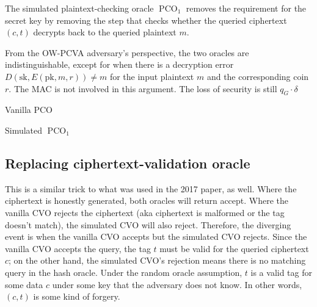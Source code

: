 \documentclass{article}
\begin{document}
The simulated plaintext-checking oracle $\operatorname{PCO}_1$ removes the requirement for the secret key by removing the step that checks whether the queried ciphertext $(c, t)$ decrypts back to the queried plaintext $m$.

From the OW-PCVA adversary's perspective, the two oracles are indistinguishable, except for when there is a decryption error $D(\text{sk}, E(\text{pk}, m, r)) \neq m$ for the input plaintext $m$ and the corresponding coin $r$. The MAC is not involved in this argument. The loss of security is still $q_G\cdot\delta$

\begin{multicols}{2}
    \begin{algorithm}[H]
        \SetAlgoLined
        \caption{Vanilla PCO}
    \end{algorithm}

    \columnbreak

    \begin{algorithm}[H]
        \SetAlgoLined
        \caption{Simulated $\operatorname{PCO}_1$}
    \end{algorithm}
\end{multicols}

\subsection{Replacing ciphertext-validation oracle}\label{replacing-cvo}
This is a similar trick to what was used in the 2017 paper, as well. Where the ciphertext is honestly generated, both oracles will return accept. Where the vanilla CVO rejects the ciphertext (aka ciphertext is malformed or the tag doesn't match), the simulated CVO will also reject. Therefore, the diverging event is when the vanilla CVO accepts but the simulated CVO rejects. Since the vanilla CVO accepts the query, the tag $t$ must be valid for the queried ciphertext $c$; on the other hand, the simulated CVO's rejection means there is no matching query in the hash oracle. Under the random oracle assumption, $t$ is a valid tag for some data $c$ under some key that the adversary does not know. In other words, $(c, t)$ is some kind of forgery.
\end{document}
